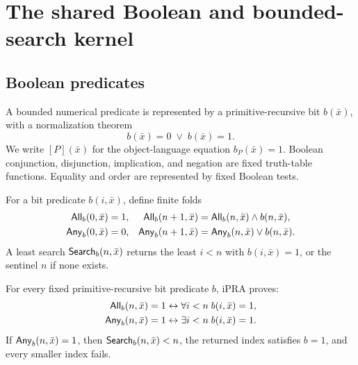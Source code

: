 \section{The shared Boolean and bounded-search kernel}
\label{sec:boolean}

\subsection{Boolean predicates}

A bounded numerical predicate is represented by a primitive-recursive bit
\(b(\bar x)\), with a normalization theorem
\[
  b(\bar x)=0\;\vee\;b(\bar x)=1.
\]
We write \([P](\bar x)\) for the object-language equation
\(b_P(\bar x)=1\).  Boolean conjunction, disjunction, implication, and
negation are fixed truth-table functions.  Equality and order are represented
by fixed Boolean tests.

For a bit predicate \(b(i,\bar x)\), define finite folds
\begin{align*}
\mathsf{All}_b(0,\bar x)&=1,
&\mathsf{All}_b(n+1,\bar x)&=\mathsf{All}_b(n,\bar x)\wedge b(n,\bar x),\\
\mathsf{Any}_b(0,\bar x)&=0,
&\mathsf{Any}_b(n+1,\bar x)&=\mathsf{Any}_b(n,\bar x)\vee b(n,\bar x).
\end{align*}
A least search \(\mathsf{Search}_b(n,\bar x)\) returns the least \(i<n\) with
\(b(i,\bar x)=1\), or the sentinel \(n\) if none exists.

\begin{theorem}
\label{thm:fold-correct}
For every fixed primitive-recursive bit predicate \(b\), iPRA proves:
\begin{align*}
\mathsf{All}_b(n,\bar x)=1
  &\leftrightarrow \forall i<n\; b(i,\bar x)=1,\\
\mathsf{Any}_b(n,\bar x)=1
  &\leftrightarrow \exists i<n\; b(i,\bar x)=1.
\end{align*}
If \(\mathsf{Any}_b(n,\bar x)=1\), then
\(\mathsf{Search}_b(n,\bar x)<n\), the returned index satisfies \(b=1\), and every
smaller index fails.
\end{theorem}

